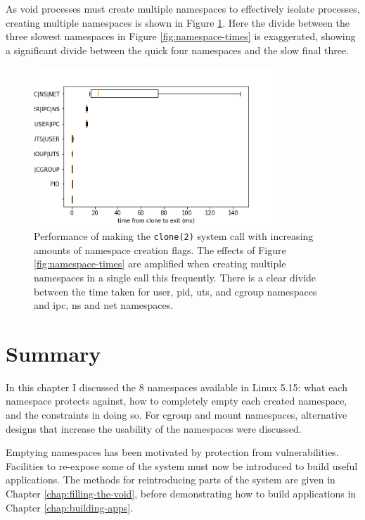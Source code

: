 \documentclass[12pt,a4paper,twoside]{report}
\begin{document}
As void processes must create multiple namespaces to effectively isolate processes, creating multiple namespaces is shown in Figure \ref{fig:namespace-stacked-times}. Here the divide between the three slowest namespaces in Figure \ref{fig:namespace-times} is exaggerated, showing a significant divide between the quick four namespaces and the slow final three.

\begin{figure}
    \centering
    \includegraphics[width=0.8\textwidth]{graphs/clone_stacked_namespaces.png}

    \caption{Performance of making the \texttt{clone(2)} system call with increasing amounts of namespace creation flags. The effects of Figure \ref{fig:namespace-times} are amplified when creating multiple namespaces in a single call this frequently. There is a clear divide between the time taken for user, pid, uts, and cgroup namespaces and ipc, ns and net namespaces.}
    \label{fig:namespace-stacked-times}
\end{figure}

\section{Summary}

In this chapter I discussed the 8 namespaces available in Linux 5.15: what each namespace protects against, how to completely empty each created namespace, and the constraints in doing so. For cgroup and mount namespaces, alternative designs that increase the usability of the namespaces were discussed.

Emptying namespaces has been motivated by protection from vulnerabilities. Facilities to re-expose some of the system must now be introduced to build useful applications. The methods for reintroducing parts of the system are given in Chapter \ref{chap:filling-the-void}, before demonstrating how to build applications in Chapter \ref{chap:building-apps}.
\end{document}
